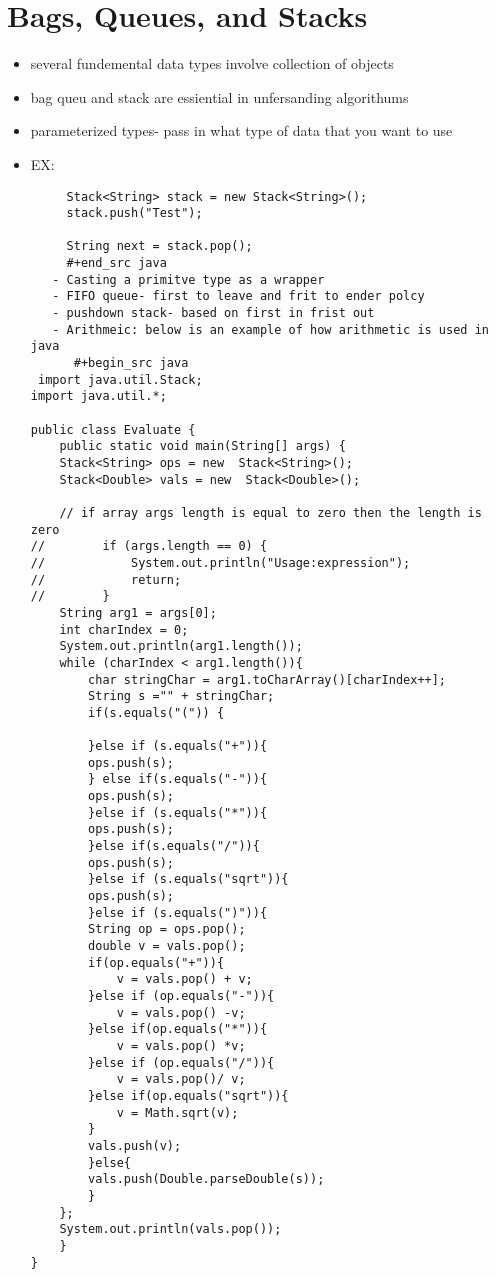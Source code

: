 \documentclass[11pt]{report}
\begin{document}
\chapter{Bags, Queues, and Stacks}
\label{sec:org7d49583}
\begin{itemize}
\item several fundemental data types involve collection of objects
\item bag queu and stack are essiential in unfersanding algorithums
\item parameterized types- pass in what type of data that you want to use
\item EX:
\begin{verbatim}
     Stack<String> stack = new Stack<String>();
     stack.push("Test");

     String next = stack.pop();
     #+end_src java
   - Casting a primitve type as a wrapper
   - FIFO queue- first to leave and frit to ender polcy
   - pushdown stack- based on first in frist out
   - Arithmeic: below is an example of how arithmetic is used in java 
      #+begin_src java
 import java.util.Stack;
import java.util.*;

public class Evaluate {
    public static void main(String[] args) {
	Stack<String> ops = new  Stack<String>();
	Stack<Double> vals = new  Stack<Double>();

	// if array args length is equal to zero then the length is zero
//        if (args.length == 0) {
//            System.out.println("Usage:expression");
//            return;
//        }
	String arg1 = args[0];
	int charIndex = 0;
	System.out.println(arg1.length());
	while (charIndex < arg1.length()){
	    char stringChar = arg1.toCharArray()[charIndex++];
	    String s ="" + stringChar;
	    if(s.equals("(")) {

	    }else if (s.equals("+")){
		ops.push(s);
	    } else if(s.equals("-")){
		ops.push(s);
	    }else if (s.equals("*")){
		ops.push(s);
	    }else if(s.equals("/")){
		ops.push(s);
	    }else if (s.equals("sqrt")){
		ops.push(s);
	    }else if (s.equals(")")){
		String op = ops.pop();
		double v = vals.pop();
		if(op.equals("+")){
		    v = vals.pop() + v;
		}else if (op.equals("-")){
		    v = vals.pop() -v;
		}else if(op.equals("*")){
		    v = vals.pop() *v;
		}else if (op.equals("/")){
		    v = vals.pop()/ v;
		}else if(op.equals("sqrt")){
		    v = Math.sqrt(v);
		}
		vals.push(v);
	    }else{
		vals.push(Double.parseDouble(s));
	    }
	};
	System.out.println(vals.pop());
    }
}


\end{verbatim}
\end{itemize}
\end{document}
